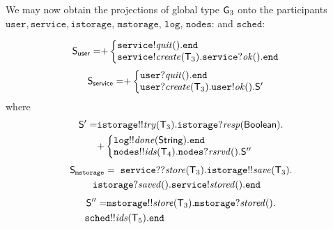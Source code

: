 We may now obtain the projections of global type ${\sf G}_3$ onto the participants $\mathtt{user}, \mathtt{service}, \mathtt{istorage}$, $\mathtt{mstorage}$, $\mathtt{log}$, $\mathtt{nodes}$: and $\mathtt{sched}$:

\begin{align*}
\ST_\mathsf{user} = &
{+}
\left\{
\begin{array}{@{}l@{}}
\mathtt{service}{!}\mathit{quit}().\tend\\
\mathtt{service}{!}\mathit{create}(\T_3).\mathtt{service}{?}\mathit{ok}().\tend\\
\end{array} \right.
\end{align*}
\begin{align*}
	\ST_\mathsf{service} = &
	{+}
	\left\{
	\begin{array}{@{}l@{}}
	\mathtt{user}{?}\mathit{quit}().\tend \\
	\mathtt{user}{?}\mathit{create}(\T_3).\mathtt{user}{!}\mathit{ok}().\ST'\\
	\end{array} \right.
\end{align*}
where
\begin{align*}
	\ST' = &
	\mathtt{istorage}{!!}\mathit{try}(\T_3).\mathtt{istorage}{?}\mathit{resp}(\mathsf{Boolean}).\\
	&
	{+}
	\left\{
	\begin{array}{@{}l@{}}
	\mathtt{log}{!!}\mathit{done}(\mathsf{String}).\tend\\
	\mathtt{nodes}{!!}\mathit{ids}(\T_4).\mathtt{nodes}{?}\mathit{rsrvd}().\ST''\\
	\end{array} \right.
\end{align*}
\begin{align*}
	\ST_\mathtt{mstorage} =  & \hspace{2mm}
	\mathtt{service}{??}\mathit{store}(\T_3).\mathtt{istorage}{!!}\mathit{save}(\T_3).\\ & \hspace{-8mm}
	\mathtt{istorage}{?}\mathit{saved}().\mathtt{service}{!}\mathit{stored}().\tend
\end{align*}
\begin{align*}
	\ST'' = & 
	\mathtt{mstorage}{!!}\mathit{store}(\T_3).\mathtt{mstorage}{?}\mathit{stored}().\\ & \hspace{-8mm}
	\mathtt{sched}{!!}\mathit{ids}(\T_5).\tend
\end{align*}
